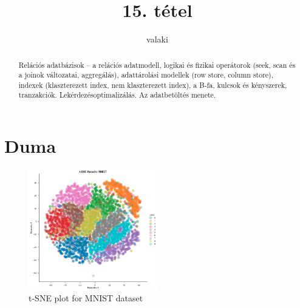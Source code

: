 \documentclass[12pt]{article}
\theoremstyle{plain}
\begin{document}
\title{15. tétel}
\author{valaki}

\maketitle


\newpage
\begin{abstract}
    Relációs adatbázisok – a relációs adatmodell, logikai és fizikai operátorok (seek, scan és a joinok változatai, aggregálás), adattárolási modellek (row store, column store), indexek (klaszterezett index, nem klaszterezett index), a B-fa, kulcsok és kényszerek, tranzakciók. Lekérdezésoptimalizálás. Az adatbetöltés menete.
\end{abstract}

\section{Duma}
\begin{figure}[H]
    \begin{center}
    \includegraphics[width=0.5\textwidth]{media/tsneplot.png}
    \caption{t-SNE plot for MNIST dataset \cite{tsne-article}} 
    \label{fig:tsneplot}
    \end{center}
\end{figure}



\end{document}
